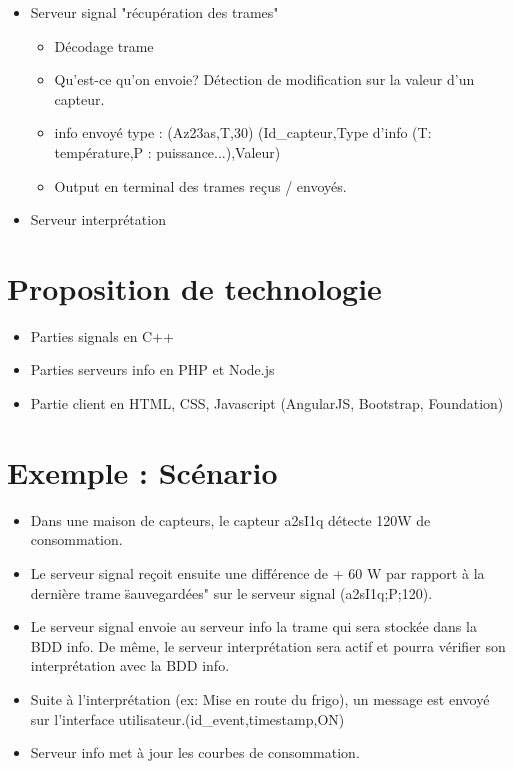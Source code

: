 \documentclass[10pt,a4paper]{article}
\begin{document}
\begin{itemize}
  \item Serveur signal "récupération des trames"
  \begin{itemize}
    \item Décodage trame
    \item Qu'est-ce qu'on envoie? Détection de modification sur la valeur d'un capteur.
    \item info envoyé type : (Az23as,T,30) (Id\_capteur,Type d'info (T: température,P : puissance...),Valeur)
    \item Output en terminal des trames reçus / envoyés.
  \end{itemize}
\end{itemize}

\begin{itemize}
\item Serveur interprétation
\end{itemize}

\section{Proposition de technologie}
\begin{itemize}
\item Parties signals en C++
\item Parties serveurs info en PHP et Node.js
\item Partie client en HTML, CSS, Javascript (AngularJS, Bootstrap, Foundation)
\end{itemize}

\section{Exemple : Scénario}
\begin{itemize}
  \item Dans une maison de capteurs, le capteur a2sI1q détecte 120W de consommation.
  \item Le serveur signal reçoit ensuite une différence de + 60 W par rapport à la dernière trame \"sauvegardées" sur le serveur signal (a2sI1q;P;120).
  \item Le serveur signal envoie au serveur info la trame qui sera stockée dans la BDD info. De même, le serveur interprétation sera actif et pourra vérifier son interprétation avec la BDD info.
  \item Suite à l'interprétation (ex: Mise en route du frigo), un message est envoyé sur l'interface utilisateur.(id\_event,timestamp,ON)
  \item Serveur info met à jour les courbes de consommation.
\end{itemize}
\end{document}
